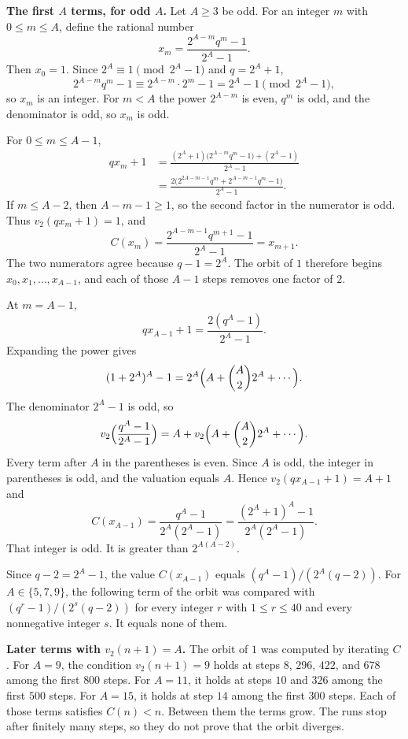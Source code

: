 \documentclass[11pt]{article}
\newcommand{\topic}[1]{\par\noindent\textbf{#1}}
\begin{document}
\topic{The first \(A\) terms, for odd \(A\).}
Let \(A \ge 3\) be odd.
For an integer \(m\) with \(0 \le m \le A\), define the rational number
\[
x_m = \frac{2^{A-m} q^m - 1}{2^A - 1}.
\]
Then \(x_0 = 1\).
Since \(2^A \equiv 1 \pmod{2^A - 1}\) and \(q = 2^A + 1\),
\[
2^{A-m} q^m - 1 \equiv 2^{A-m} \cdot 2^m - 1 = 2^A - 1 \pmod{2^A - 1},
\]
so \(x_m\) is an integer.
For \(m < A\) the power \(2^{A-m}\) is even, \(q^m\) is odd, and the denominator is odd, so \(x_m\) is odd.

For \(0 \le m \le A - 1\),
\begin{align*}
qx_m + 1
&= \frac{(2^A + 1)\bigl(2^{A-m} q^m - 1\bigr) + (2^A - 1)}{2^A - 1} \\
&= \frac{2\bigl(2^{2A - m - 1} q^m + 2^{A - m - 1} q^m - 1\bigr)}{2^A - 1}.
\end{align*}
If \(m \le A - 2\), then \(A - m - 1 \ge 1\), so the second factor in the numerator is odd.
Thus \(v_2(qx_m + 1) = 1\), and
\[
C(x_m) = \frac{2^{A-m-1} q^{m+1} - 1}{2^A - 1} = x_{m+1}.
\]
The two numerators agree because \(q - 1 = 2^A\).
The orbit of \(1\) therefore begins \(x_0, x_1, \ldots, x_{A-1}\), and each of those \(A - 1\) steps removes one factor of \(2\).

At \(m = A - 1\),
\[
qx_{A-1} + 1 = \frac{2(q^A - 1)}{2^A - 1}.
\]
Expanding the power gives
\[
(1 + 2^A)^A - 1 = 2^A \Bigl(A + \binom{A}{2} 2^A + \cdots\Bigr).
\]
The denominator \(2^A - 1\) is odd, so
\[
v_2\Bigl(\frac{q^A - 1}{2^A - 1}\Bigr) = A + v_2\Bigl(A + \binom{A}{2} 2^A + \cdots\Bigr).
\]
Every term after \(A\) in the parentheses is even.
Since \(A\) is odd, the integer in parentheses is odd, and the valuation equals \(A\).
Hence \(v_2(qx_{A-1} + 1) = A + 1\) and
\[
C(x_{A-1}) = \frac{q^A - 1}{2^A(2^A - 1)} = \frac{(2^A + 1)^A - 1}{2^A(2^A - 1)}.
\]
That integer is odd.
It is greater than \(2^{A(A-2)}\).

Since \(q - 2 = 2^A - 1\), the value \(C(x_{A-1})\) equals \((q^A - 1)/(2^A(q - 2))\).
For \(A \in \{5, 7, 9\}\), the following term of the orbit was compared with \((q^r - 1)/(2^s(q - 2))\) for every integer \(r\) with \(1 \le r \le 40\) and every nonnegative integer \(s\).
It equals none of them.

\topic{Later terms with \(v_2(n+1) = A\).}
The orbit of \(1\) was computed by iterating \(C\).
For \(A = 9\), the condition \(v_2(n+1) = 9\) holds at steps \(8\), \(296\), \(422\), and \(678\) among the first \(800\) steps.
For \(A = 11\), it holds at steps \(10\) and \(326\) among the first \(500\) steps.
For \(A = 15\), it holds at step \(14\) among the first \(300\) steps.
Each of those terms satisfies \(C(n) < n\).
Between them the terms grow.
The runs stop after finitely many steps, so they do not prove that the orbit diverges.
\end{document}

